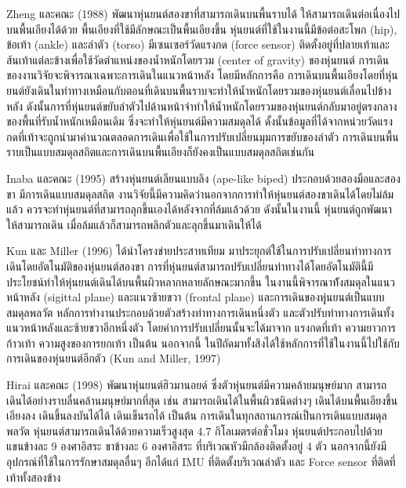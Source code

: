 Zheng และคณะ (1988) พัฒนาหุ่นยนต์สองขาที่สามารถเดินบนพื้นราบได้ ให้สามารถเดินต่อเนื่องไปบนพื้นเอียงได้ด้วย
พื้นเอียงที่ใช้มีลักษณะเป็นพื้นเอียงขึ้น หุ่นยนต์ที่ใช้ในงานนี้มีข้อต่อสะโพก (hip), ข้อเท้า (ankle) และลำตัว (torso) มีเซนเซอร์วัดแรงกด (force sensor)
ติดตั้งอยู่ที่ปลายเท้าและส้นเท้าแต่ละข้างเพื่อใช้วัดตำแหน่งของน้ำหนักโดยรวม (center of gravity) ของหุ่นยนต์ การเดินของงานวิจัยจะพิจารณาเฉพาะการเดินในแนวหน้าหลัง
โดยมีหลักการคือ การเดินบนพื้นเอียงโดยที่หุ่นยนต์ยังเดินในท่าทางเหมือนกับตอนที่เดินบนพื้นราบจะทำให้น้ำหนักโดยรวมของหุ่นยนต์เลื่อนไปข้างหลัง
ดังนั้นการที่หุ่นยนต์ขยับลำตัวไปด้านหน้าจำทำให้น้ำหนักโดยรวมของหุ่นยนต์กลับมาอยู่ตรงกลางของพื้นที่รับน้ำหนักเหมือนเดิม
ซึ่งจะทำให้หุ่นยนต์มีความสมดุลได้ ดั้งนั้นข้อมูลที่ได้จากหน่วยวัดแรงกดที่เท้าจะถูกนำมาคำนวณตลอดการเดินเพื่อใช้ในการปรับเปลี่ยนมุมการขยับของลำตัว
การเดินบนพื้นราบเป็นแบบสมดุลสถิตและการเดินบนพื้นเอียงก็ยังคงเป็นแบบสมดุลสถิตเช่นกัน

Inaba และคณะ (1995) สร้างหุ่นยนต์เลียนแบบลิง (ape-like biped) ประกอบด้วยสองมือและสองขา มีการเดินแบบสมดุลสถิต
งานวิจัยนี้มีความคิดว่านอกจากการทำให้หุ่นยนต์สองขาเดินได้โดยไม่ล้มแล้ว ควรจะทำหุ่นยนต์ที่สามารถลุกขึ้นเองได้หลังจากที่ล้มแล้วด้วย
ดังนั้นในงานนี้ หุ่นยนต์ถูกพัฒนาให้สามารถเดิน เมื่อล้มแล้วก็สามารถพลิกตัวและลุกขึ้นมาเดินให้ได้

Kun และ Miller (1996) ได้นำโครงข่ายประสาทเทียม มาประยุกต์ใช้ในการปรับเปลี่ยนท่าทางการเดินโดยอัตโนมัติของหุ่นยนต์สองขา
การที่หุ่นยนต์สามารถปรับเปลี่ยนท่าทางได้โดยอัตโนมัตินี้มีประโยชน์ทำให้หุ่นยนต์เดินได้บนพื้นผิวหลากหลายลักษณะมากขึ้น
ในงานนี้พิจารณาท้ังสมดุลในแนวหน้าหลัง (sigittal plane) และแนวซ้ายขวา (frontal plane) และการเดินของหุุ่นยนต์เป็นแบบสมดุลพลวัต
หลักการทำงานประกอบด้วยตัวสร้างท่าทางการเดินหนึ่งตัว และตัวปรับท่าทางการเดินทั้งแนวหน้าหลังและซ้ายขวาอีกหนึ่งตัว
โดยค่าการปรับเปลี่ยนนั้นจะได้มาจาก แรงกดที่เท้า ความยาวการก้าวเท้า ความสูงของการยกเท้า เป็นต้น นอกจากนี้
ในปีถัดมาทั้งสิงได้ใช้หลักการที่ใช้ในงานนี้ไปใช้กับการเดินของหุ่นยนต์อีกตัว (Kun and Miller, 1997)

Hirai และคณะ (1998) พัฒนาหุ่นยนต์ฮิวมานอยด์ ซึ่งตัวหุ่นยนต์มีความคล้ายมนุษย์มาก สามารถเดินได้อย่างราบลื่นคล้านมนุษย์มากที่สุด
เช่น สามารถเดินได้ในพื้นผิวชนิดต่างๆ เดินได้บนพื้นเอียงขึ้นเอียงลง เดินขึ้นลงบันได้ได้ เดินเข็นรถได้ เป็นต้น การเดินในทุกสถานการณ์เป็นการเดินแบบสมดุลพลวัต
หุ่นยนต์สามารถเดินได้ด้วยความเร็วสูงสุด 4.7 กิโลเมตรต่อชั่วโมง หุ่นยนต์ประกอบไปด้วย แขนข้างละ 9 องศาอิสระ ขาข้างละ 6 องศาอิสระ
ที่บริเวณหัวมีกล้องติดตั้งอยู่ 4 ตัว นอกจากนี้ยังมีอุปกรณ์ที่ใช้ในการรักษาสมดุลอื่นๆ อีกได้แก่ IMU ที่ติดตั้งบริเวณลำตัว และ Force sensor ที่ติดที่เท้าทั้งสองข้าง


